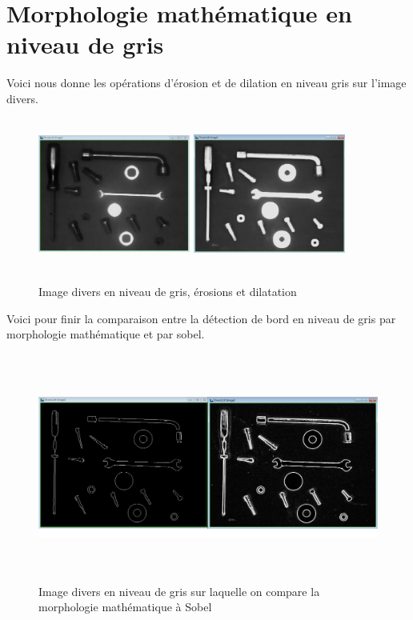 \documentclass{scrreprt}
\begin{document}
\newpage
\section{Morphologie mathématique en niveau de gris}

Voici nous donne les opérations d'érosion et de dilation en niveau gris sur l'image divers.

\begin{figure}[!h]
\centering
\includegraphics[height=5cm,width=5cm]{images/graylevelerode.png} \hfill
\includegraphics[height=5cm,width=5cm]{images/grayleveldilate.png}
\caption{Image divers en niveau de gris, érosions et dilatation}
\end{figure}

Voici pour finir la comparaison entre la détection de bord en niveau de gris par morphologie mathématique et
par sobel. 

\begin{figure}[!h]
\centering
\includegraphics[height=7.5cm,width=15cm]{images/sobelVSMorphology.png}
\caption{Image divers en niveau de gris sur laquelle on compare la morphologie mathématique à Sobel}
\end{figure} 
\end{document}
